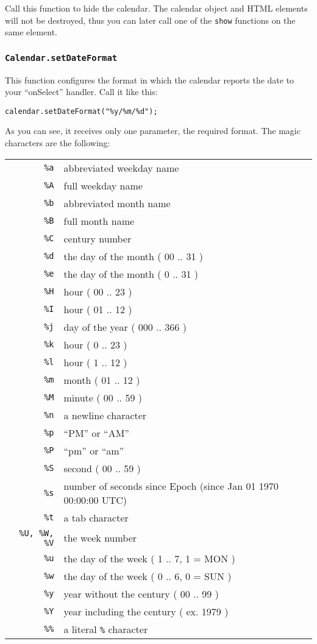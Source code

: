 \documentclass[a4paper,twoside,10pt]{dynadoc}
\begin{document}
Call this function to hide the calendar.  The calendar object and HTML elements
will not be destroyed, thus you can later call one of the \texttt{show}
functions on the same element.

\subsubsection{\texttt{Calendar.setDateFormat}}\label{sec:Calendar.setDateFormat}

This function configures the format in which the calendar reports the date to
your ``onSelect'' handler.  Call it like this:

\begin{verbatim}
calendar.setDateFormat("%y/%m/%d");
\end{verbatim}

As you can see, it receives only one parameter, the required format.  The magic
characters are the following:

\begin{tabular}{ r l }
\\
\texttt{\%a} & abbreviated weekday name \\
\texttt{\%A} & full weekday name \\
\texttt{\%b} & abbreviated month name \\
\texttt{\%B} & full month name \\
\texttt{\%C} & century number \\
\texttt{\%d} & the day of the month ( 00 .. 31 ) \\
\texttt{\%e} & the day of the month ( 0 .. 31 ) \\
\texttt{\%H} & hour ( 00 .. 23 ) \\
\texttt{\%I} & hour ( 01 .. 12 ) \\
\texttt{\%j} & day of the year ( 000 .. 366 ) \\
\texttt{\%k} & hour ( 0 .. 23 ) \\
\texttt{\%l} & hour ( 1 .. 12 ) \\
\texttt{\%m} & month ( 01 .. 12 ) \\
\texttt{\%M} & minute ( 00 .. 59 ) \\
\texttt{\%n} & a newline character \\
\texttt{\%p} & ``PM'' or ``AM'' \\
\texttt{\%P} & ``pm'' or ``am'' \\
\texttt{\%S} & second ( 00 .. 59 ) \\
\texttt{\%s} & number of seconds since Epoch (since Jan 01 1970 00:00:00 UTC) \\
\texttt{\%t} & a tab character \\
\texttt{\%U, \%W, \%V} & the week number\footnotemark\\
\texttt{\%u} & the day of the week ( 1 .. 7, 1 = MON )\\
\texttt{\%w} & the day of the week ( 0 .. 6, 0 = SUN )\\
\texttt{\%y} & year without the century ( 00 .. 99 )\\
\texttt{\%Y} & year including the century ( ex. 1979 )\\
\texttt{\%\%} & a literal \texttt{\%} character
\end{tabular}
\end{document}
